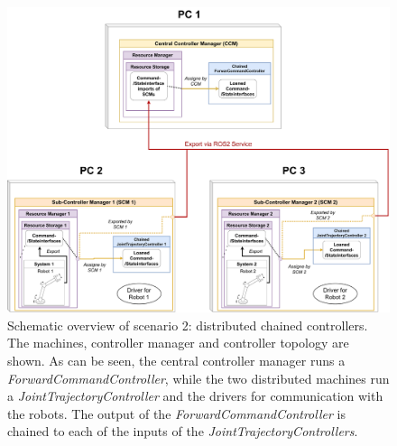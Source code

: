 \begin{figure}[htbp]
	\centering
	\includegraphics[width=1\textwidth]{Figures/c6/test_scenario_2.pdf}
	\caption{Schematic overview of scenario 2: distributed chained controllers. The machines, controller manager and controller topology are shown. As can be seen, the central controller manager runs a \textit{ForwardCommandController}, while the two distributed machines run a \textit{JointTrajectoryController} and the drivers for communication with the robots. The output of the \textit{ForwardCommandController} is chained to each of the inputs of the \textit{JointTrajectoryControllers}.}
	\label{c6_fig_test_scenario_2}
\end{figure}

